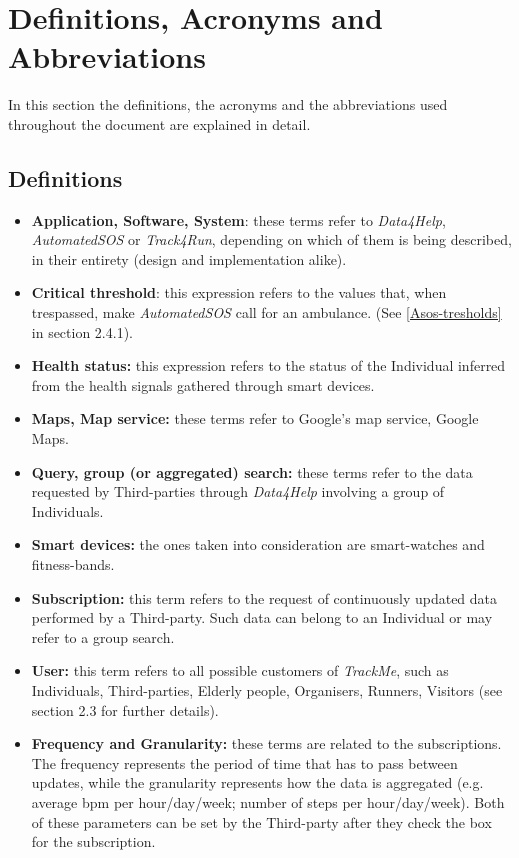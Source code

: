 \section{Definitions, Acronyms and Abbreviations}
    In this section the definitions, the acronyms and the abbreviations used throughout the document are explained in detail.
    
    \subsection{Definitions}
        \begin{itemize}
            \item \textbf{Application, Software, System}: these terms refer to \emph{Data4Help}, \emph{AutomatedSOS} or \emph{Track4Run}, depending on which of them is being described, in their entirety (design and implementation alike).
            
            \item \textbf{Critical threshold}: this expression refers to the values that, when trespassed, make \emph{AutomatedSOS} call for an ambulance. (See \ref{Asos-tresholds} in section 2.4.1). 
            
            \item \textbf{Health status:} this expression refers to the status of the Individual inferred from the health signals gathered through smart devices.
            
            \item \textbf{Maps, Map service:} these terms refer to Google's map service, Google Maps.
            
            \item \textbf{Query, group (or aggregated) search:} these terms refer to the data requested by Third-parties through \emph{Data4Help} involving a group of Individuals.
            
            \item \textbf{Smart devices:} the ones taken into consideration are smart-watches and fitness-bands.
            
            \item \textbf{Subscription:} this term refers to the request of continuously updated data performed by a Third-party. Such data can belong to an Individual or may refer to a group search.
                        
            \item \textbf{User:} this term refers to all possible customers of \emph{TrackMe}, such as Individuals, Third-parties, Elderly people, Organisers, Runners, Visitors (see section 2.3 for further details).
            
            \item \textbf{Frequency and Granularity:} these terms are related to the subscriptions. The frequency represents the period of time that has to pass between updates, while the granularity represents how the data is aggregated (e.g. average bpm per hour/day/week; number of steps per hour/day/week). Both of these parameters can be set by the Third-party after they check the box for the subscription.
        \end{itemize}
        
